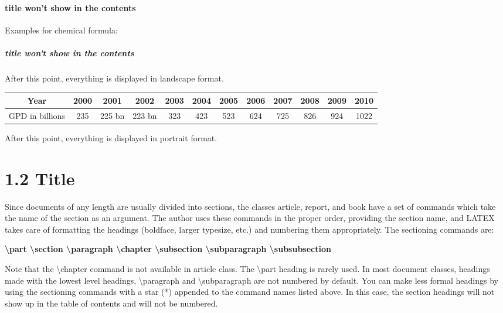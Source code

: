 \documentclass[12pt,openright]{book}
\begin{document}
\paragraph{title won't show in the contents} 

Examples for chemical formula:

\vskip 0.1in





\vskip 0.1in

\subparagraph{title won't show in the contents}

\begin{landscape}
  After this point, everything is displayed in landscape format.
  
  \begin{tabular}{|c|c|c|c|c|c|c|c|c|c|c|c|}
    \hline
    Year & 2000 & 2001 & 2002 & 2003 & 2004 & 2005 & 2006 & 2007 & 2008 & 2009 & 2010 \\
    \hline 
    GPD in billions & 235  &  225 bn & 223 bn & 323 & 423  & 523 & 624 & 725 & 826  & 924  & 1022  \\
    \hline 
  \end{tabular}
\end{landscape}

After this point, everything is displayed in portrait format.

\section{1.2 Title}

Since documents of any length are usually divided into sections, the classes article, report, and book have a set of commands which take the name of the section as an argument. The author uses these commands in the proper order, providing the section name, and LATEX takes care of formatting the headings (boldface, larger typesize, etc.) and numbering them appropriately. The sectioning commands are:

\textbf{\textbackslash part \textbackslash section \textbackslash paragraph
\textbackslash chapter \textbackslash subsection \textbackslash subparagraph
\textbackslash subsubsection}

Note that the \textbackslash chapter command is not available in article class. The \textbackslash part heading is rarely used. In most document classes, headings made with the lowest level headings, \textbackslash paragraph and \textbackslash subparagraph are not numbered by default. You can make less formal headings by using the sectioning commands with a star (*) appended to the  command names listed above. In this case, the section headings will
not show up in the table of contents and will not be numbered.
\end{document}
